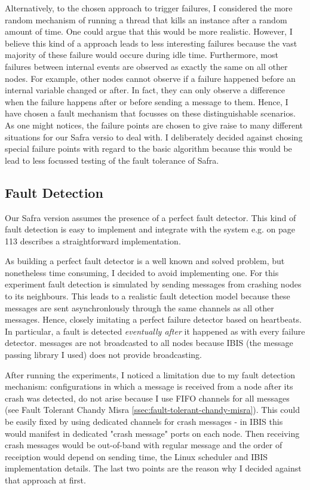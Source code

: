 	Alternatively, to the chosen approach to trigger failures, I considered the more random mechanism of running a thread that kills an instance after a random amount of time.
	One could argue that this would be more realistic.
	However, I believe this kind of a approach leads to less interesting failures because the vast majority of these failure would occure during idle time. 
	Furthermore, most failures between internal events are observed as exactly the same on all other nodes. 
	For example, other nodes cannot observe if a failure happened before an internal variable changed or after. 
	In fact, they can only observe a difference when the failure happens after or before sending a message to them.
	Hence, I have chosen a fault mechanism that focusses on these distinguishable scenarios.
	As one might notices, the failure points are chosen to give raise to many different situations for our Safra versio to deal with. 
	I deliberately decided against chosing special failure points with regard to the basic algorithm because this would be lead to less focussed testing of the fault tolerance of Safra.
	
\subsection{Fault Detection}
Our Safra version assumes the presence of a perfect fault detector.
This kind of fault detection is easy to implement and integrate with the system e.g.
\cite{Fokkink:2018} on page 113 describes a straightforward implementation.

As building a perfect fault detector is a well known and solved problem, but nonetheless time consuming, I decided to avoid implementing one.
For this experiment fault detection is simulated by sending  messages from crashing nodes to its neighbours. 
This leads to a realistic fault detection model because these messages are sent asynchronlously through the same channels as all other messages. 
Hence, closely imitating a perfect failure detector based on heartbeats. 
In particular, a fault is detected \textit{eventually after} it happened as with every failure detector.
 messages are not broadcasted to all nodes because IBIS (the message passing library I used) does not provide broadcasting.

After running the experiments, I noticed a limitation due to my fault detection mechanism:
configurations in which a message is received from a node after its crash was detected, do not arise because I use FIFO channels for all messages (see Fault Tolerant Chandy Misra \cref{ssec:fault-tolerant-chandy-misra}).  
This could be easily fixed by using dedicated channels for crash messages - in IBIS this would manifest in dedicated "crash message" ports on each node.
Then receiving crash messages would be out-of-band with regular message and the order of receiption would depend on sending time, the Linux scheduler and IBIS implementation details.
The last two points are the reason why I decided against that approach at first.

